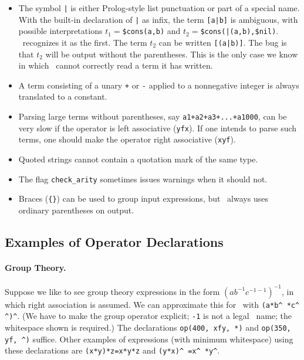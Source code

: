 \documentclass[11pt]{article}
\begin{document}
\begin{itemize}
\item
The symbol \verb:|: is either Prolog-style list punctuation or part of
a special name.  With the built-in declaration of \verb:|: as infix,
the term \verb:[a|b]: is ambiguous, with possible interpretations
$t_1=$\verb:$cons(a,b): and $t_2=$\verb:$cons(|(a,b),$nil):.
\otter\ recognizes it as the first.  The term $t_2$
can be written \verb:[(a|b)]:.  The bug is that $t_2$ will be output
without the parentheses.  This is the only case we know in which
\otter\ cannot correctly read a term it has written.
\item
A term consisting of a unary \verb:+: or \verb:-: applied
to a nonnegative integer is always translated to a constant.
\item
Parsing large terms without parentheses, say
\verb:a1+a2+a3+...+a1000:, can be very slow if the operator
is left associative (\verb:yfx:).  If one intends to parse such terms,
one should make the operator right associative (\verb:xyf:).
\item
Quoted strings cannot contain a quotation mark of the same type.
\item
The flag \verb:check_arity: sometimes issues warnings when it
should not.
\item
Braces (\verb:{}:) can be used to group input expressions,
but \otter\ always uses ordinary parentheses on output.
\end{itemize}

\subsection{Examples of Operator Declarations}

\paragraph{Group Theory.}  Suppose we like to see group theory expressions
in the form $(ab^{-1}c^{-1-1})^{-1}$, in which right association is assumed.
We can approximate this for \otter\
with \verb:(a*b^ *c^ ^)^:.  (We have to make the group operator explicit;
\verb:-1: is not a legal \otter\ name; the whitespace shown is required.)
The declarations \verb:op(400, xfy, *): and \verb:op(350, yf, ^):
suffice.  Other examples of expressions (with minimum whitespace)
using these declarations are \verb:(x*y)*z=x*y*z: and \verb:(y*x)^ =x^ *y^:.
\end{document}
